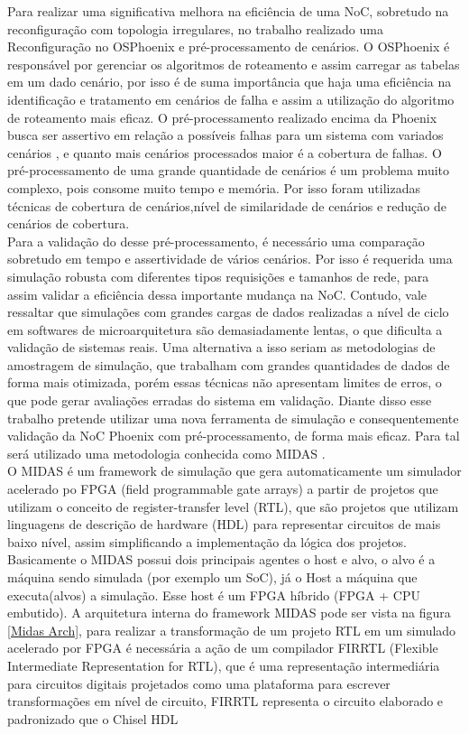 \documentclass[conference]{IEEEtran}
\begin{document}
	Para realizar uma significativa melhora na eficiência de uma NoC, sobretudo na reconfiguração com topologia irregulares, no trabalho \cite{b5} realizado uma Reconfiguração no OSPhoenix e  pré-processamento de cenários. O OSPhoenix é responsável por gerenciar os algoritmos de roteamento e assim carregar as tabelas em um dado cenário, por isso é de suma importância que haja uma eficiência na identificação e tratamento em cenários de falha e assim a utilização do algoritmo de roteamento mais eficaz.
	O pré-processamento realizado encima da Phoenix busca ser assertivo em relação a possíveis falhas para um sistema com variados cenários , e quanto mais cenários processados maior é a cobertura de falhas. O pré-processamento de uma grande quantidade de cenários é um problema muito complexo, pois consome muito tempo e memória. Por isso foram utilizadas técnicas de cobertura de cenários,nível de similaridade de cenários e redução de cenários de cobertura. \\
	Para a validação do desse pré-processamento, é necessário uma comparação sobretudo em tempo e assertividade de vários cenários. Por isso é requerida uma simulação robusta com diferentes tipos requisições e tamanhos de rede, para assim validar a eficiência dessa importante mudança na NoC. Contudo, vale ressaltar que simulações com grandes cargas de dados realizadas a nível de ciclo em softwares de microarquitetura são demasiadamente lentas, o que dificulta a validação de sistemas reais. Uma alternativa a isso seriam as metodologias de amostragem de simulação, que trabalham com grandes quantidades de dados de forma mais otimizada, porém essas técnicas não apresentam limites de erros, o que pode gerar avaliações erradas do sistema em validação\cite{b9}. Diante disso esse trabalho pretende utilizar uma nova ferramenta de simulação e consequentemente validação da NoC Phoenix com pré-processamento, de forma mais eficaz. Para tal será utilizado uma metodologia conhecida como MIDAS \cite{b8}.\\
	O MIDAS é um framework de simulação que gera automaticamente um simulador acelerado po FPGA (field programmable gate arrays) a partir de projetos que utilizam o conceito de register-transfer level (RTL), que são projetos que utilizam linguagens de descrição de hardware (HDL) para representar circuitos de mais baixo nível, assim simplificando a implementação da lógica dos projetos. Basicamente o MIDAS possui dois principais agentes o host e alvo, o alvo é a máquina sendo simulada (por exemplo um SoC), já o Host a máquina que executa(alvos) a simulação. Esse host é um FPGA híbrido (FPGA + CPU embutido). A arquitetura interna do framework MIDAS pode ser vista na figura \ref{Midas Arch}, para realizar a transformação de um projeto RTL em um simulado acelerado por FPGA é necessária a ação de um compilador FIRRTL (Flexible Intermediate Representation for RTL), que é uma representação intermediária para circuitos digitais projetados como uma plataforma para escrever transformações em nível de circuito, FIRRTL representa o circuito elaborado e padronizado que o Chisel HDL
\end{document}
